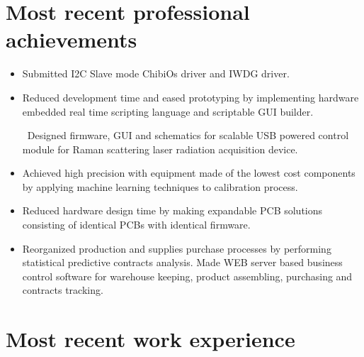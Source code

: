 \documentclass[10pt,letterpaper,oneside,sans]{moderncv}
\begin{document}
\section{Most recent professional achievements}
\begin{itemize}

\item Submitted I2C Slave mode ChibiOs driver and IWDG driver.

\item Reduced development time and eased prototyping by implementing hardware embedded real time scripting language and scriptable GUI builder.

\ Designed firmware, GUI and schematics for scalable USB powered control module for Raman scattering laser radiation acquisition device.

\item Achieved high precision with equipment made of the lowest cost components by applying machine learning techniques to calibration process.

\item Reduced hardware design time by making expandable PCB solutions consisting of identical PCBs with identical firmware.

\item Reorganized production and supplies purchase processes by performing statistical predictive contracts analysis. Made WEB server based business control software for warehouse keeping, product assembling, purchasing and contracts tracking.

\end{itemize}



\vspace*{-4mm}
\section{Most recent work experience}



\end{document}
